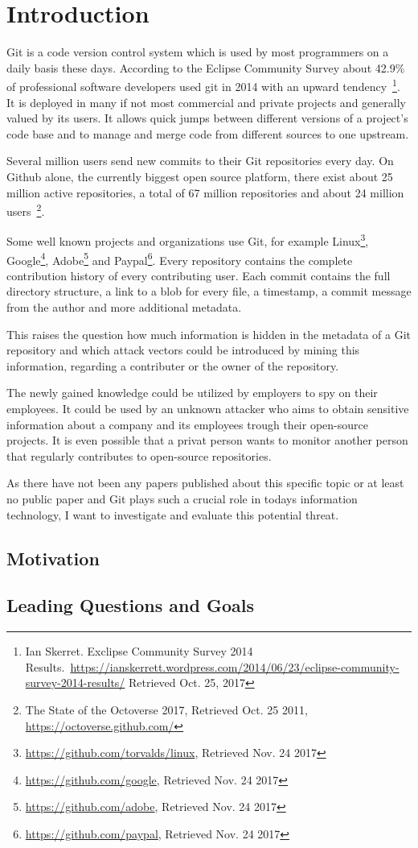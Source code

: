 \chapter{Introduction}

Git is a code version control system which is used by most programmers on a daily basis these days. According to the Eclipse Community Survey about 42.9\% of professional software developers used git in 2014 with an upward tendency~\footnote{Ian Skerret. Exclipse Community Survey 2014 Results.\ \url{https://ianskerrett.wordpress.com/2014/06/23/eclipse-community-survey-2014-results/} Retrieved Oct. 25, 2017}.
It is deployed in many if not most commercial and private projects and generally valued by its users. It allows quick jumps between different versions of a project's code base and to manage and merge code from different sources to one upstream.

Several million users send new commits to their Git repositories every day.
On Github alone, the currently biggest open source platform, there exist about 25 million active repositories, a total of 67 million repositories and about 24 million users~\footnote{The State of the Octoverse 2017, Retrieved Oct. 25 2011, \url{https://octoverse.github.com/}}.

Some well known projects and organizations use Git, for example Linux\footnote{\url{https://github.com/torvalds/linux}, Retrieved Nov. 24 2017}, Google\footnote{\url{https://github.com/google}, Retrieved Nov. 24 2017}, Adobe\footnote{\url{https://github.com/adobe}, Retrieved Nov. 24 2017} and Paypal\footnote{\url{https://github.com/paypal}, Retrieved Nov. 24 2017}.
Every repository contains the complete contribution history of every contributing user.
Each commit contains the full directory structure, a link to a blob for every file, a timestamp, a commit message from the author and more additional metadata.

This raises the question how much information is hidden in the metadata of a Git repository and which attack vectors could be introduced by mining this information, regarding a contributer or the owner of the repository.

The newly gained knowledge could be utilized by employers to spy on their employees.
It could be used by an unknown attacker who aims to obtain sensitive information about a company and its employees trough their open-source projects.
It is even possible that a privat person wants to monitor another person that regularly contributes to open-source repositories.

As there have not been any papers published about this specific topic or at least no public paper and Git plays such a crucial role in todays information technology, I want to investigate and evaluate this potential threat.

\section{Motivation}

\section{Leading Questions and Goals}
